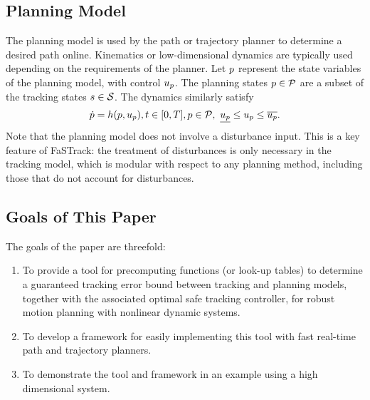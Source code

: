\subsection{Planning Model}
The planning model is used by the path or trajectory planner to determine a desired path online. Kinematics or low-dimensional dynamics are typically used depending on the requirements of the planner. Let $p$ represent the state variables of the planning model, with control $u_p$. The planning states $p \in \mathcal{P}$ are a subset of the tracking states $s \in \mathcal{S}$. The dynamics similarly satisfy 
\begin{equation}
\begin{aligned}
\label{eq:pdyn}
\dot{p} = h(p, u_p), t \in [0, T], p \in \mathcal{P}, \ \underline{u_p} \leq u_p \leq \overline{u_p}.
\end{aligned}
\end{equation}
Note that the planning model does not involve a disturbance input. This is a key feature of FaSTrack: the treatment of disturbances is only necessary in the tracking model, which is modular with respect to any planning method, including those that do not account for disturbances.

\subsection{Goals of This Paper}
The goals of the paper are threefold:
\begin{enumerate}
	\item To provide a tool for precomputing functions (or look-up tables) to determine a guaranteed tracking error bound between tracking and planning models, together with the associated optimal safe tracking controller, for robust motion planning with nonlinear dynamic systems.
	\item To develop a framework for easily implementing this tool with fast real-time path and trajectory planners.
	\item To demonstrate the tool and framework in an example using a high dimensional system.
\end{enumerate}
